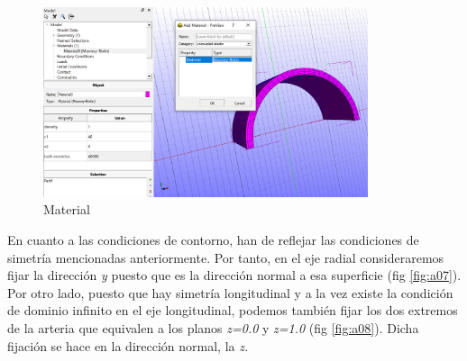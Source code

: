 \begin{figure}[!htp]
\centering
\includegraphics[width=0.85\textwidth]{figuras_3/a3.png}
\caption{Material}
\label{fig:a06}
\end{figure}

En cuanto a las condiciones de contorno, han de reflejar las condiciones de simetría mencionadas anteriormente. Por tanto, en el eje radial consideraremos fijar la dirección \emph{y} puesto que es la dirección normal a esa superficie (fig \ref{fig:a07}). Por otro lado, puesto que hay simetría longitudinal y a la vez existe la condición de dominio infinito en el eje longitudinal, podemos también fijar los dos extremos de la arteria que equivalen a los planos \emph{z=0.0} y \emph{z=1.0 }(fig \ref{fig:a08}). Dicha fijación se hace en la dirección normal, la \emph{z.}

